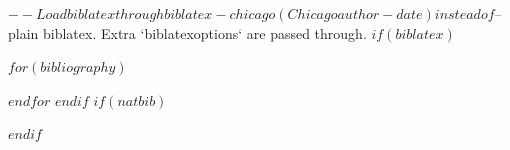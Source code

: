 $-- Load biblatex through biblatex-chicago (Chicago author-date) instead of
$-- plain biblatex.  Extra `biblatexoptions` are passed through.
$if(biblatex)$
\usepackage[authordate, backend=biber$for(biblatexoptions)$, $biblatexoptions$$endfor$]{biblatex-chicago}
$for(bibliography)$

$endfor$
$endif$
$if(natbib)$
\usepackage[$natbiboptions$]{natbib}

$endif$
